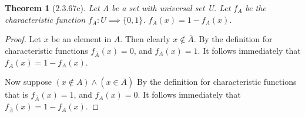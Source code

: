 \documentclass[a4paper, 12pt]{article}
\theoremstyle{plain}
\newtheorem*{theorem*}{Theorem}
\begin{document}
	
	\begin{theorem*}[2.3.67c]
		Let A be a set with universal set U. Let $f_{A}$ be the \newline characteristic function 
		$f_{\overline{A}}: U \implies \{0, 1\}$. $f_{\overline{A}}(x) = 1 - f_{A}(x)$.
	\end{theorem*}
	
	\begin{proof}
		Let $x$ be an element in $A$. Then clearly $x \notin \overline{A}$. By the definition for 
		characteristic functions $f_{\overline{A}}(x) = 0$, and $f_{A}(x) = 1$. It follows 
		immediately that $f_{\overline{A}}(x) = 1 - f_{A}(x)$.
		
		Now suppose $(x \notin A) \land (x \in \overline{A})$ By the definition for characteristic 
		functions that is $f_{\overline{A}}(x) = 1$, and $f_{A}(x) = 0$. It follows immediately 
		that $f_{\overline{A}}(x) = 1 - f_{A}(x)$.
	\end{proof}
\end{document}

